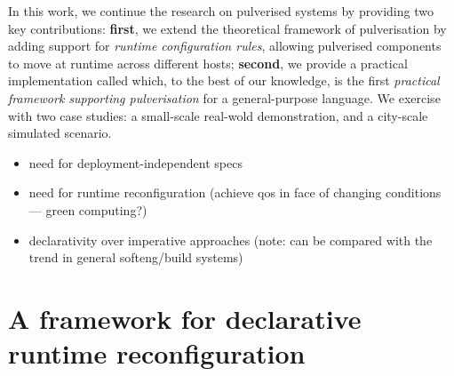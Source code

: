 \documentclass[conference]{IEEEtran}
\begin{document}
In this work,
we continue the research on pulverised systems by providing two key contributions:
\textbf{first}, we extend the theoretical framework of pulverisation by adding support for
\emph{runtime configuration rules}, allowing pulverised components to move at runtime across different hosts;
\textbf{second}, we provide a practical implementation called \ourframework{} which,
to the best of our knowledge,
is the first \emph{practical framework supporting pulverisation} for a general-purpose language.
%
We exercise \ourframework{} with two case studies:
a small-scale real-wold demonstration, and a city-scale simulated scenario.

\begin{itemize}
    \item need for deployment-independent specs
    \item need for runtime reconfiguration (achieve \ac{qos} in face of changing conditions --- green computing?)
    \item declarativity over imperative approaches (note: can be compared with the trend in general softeng/build systems)
\end{itemize}

\section{A framework for declarative runtime reconfiguration}\label{sec:contribution}
\end{document}

